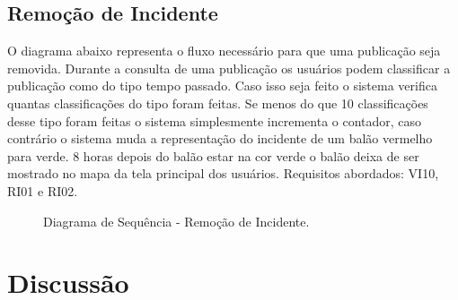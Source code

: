 \documentclass[12pt]{article}
\begin{document}
\subsection{Remoção de Incidente}

O diagrama abaixo representa o fluxo necessário para que uma publicação seja removida. Durante a consulta de uma publicação os usuários podem classificar a publicação como do tipo tempo passado. Caso isso seja feito o sistema verifica quantas classificações do tipo foram feitas. Se menos do que 10 classificações desse tipo foram feitas o sistema simplesmente incrementa o contador, caso contrário o sistema muda a representação do incidente de um balão vermelho para verde. 8 horas depois do balão estar na cor verde o balão deixa de ser mostrado no mapa da tela principal dos usuários. Requisitos abordados: VI10, RI01 e RI02.

\begin{figure}[H]
    \caption{\label{fig:dssRemo0e1v} Diagrama de Sequência - Remoção de Incidente.}
  \end{figure}

\section{Discussão}
\end{document}
